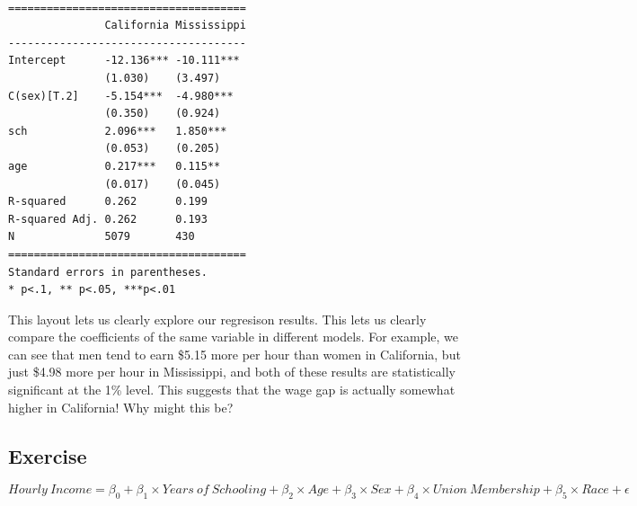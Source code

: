 \documentclass[
  letterpaper,
  DIV=11,
  numbers=noendperiod]{scrreprt}
\begin{document}
\begin{verbatim}

=====================================
               California Mississippi
-------------------------------------
Intercept      -12.136*** -10.111*** 
               (1.030)    (3.497)    
C(sex)[T.2]    -5.154***  -4.980***  
               (0.350)    (0.924)    
sch            2.096***   1.850***   
               (0.053)    (0.205)    
age            0.217***   0.115**    
               (0.017)    (0.045)    
R-squared      0.262      0.199      
R-squared Adj. 0.262      0.193      
N              5079       430        
=====================================
Standard errors in parentheses.
* p<.1, ** p<.05, ***p<.01
\end{verbatim}

This layout lets us clearly explore our regresison results. This lets us
clearly compare the coefficients of the same variable in different
models. For example, we can see that men tend to earn \$5.15 more per
hour than women in California, but just \$4.98 more per hour in
Mississippi, and both of these results are statistically significant at
the 1\% level. This suggests that the wage gap is actually somewhat
higher in California! Why might this be?

\hypertarget{exercise-24}{%
\subsection{Exercise}\label{exercise-24}}

\[ Hourly\ Income= \beta_0 + \beta_1 \times Years\ of\ Schooling + \beta_2 \times Age + \beta_3 \times Sex + \beta_4 \times Union\ Membership + \beta_5 \times Race +\epsilon \]
\end{document}
